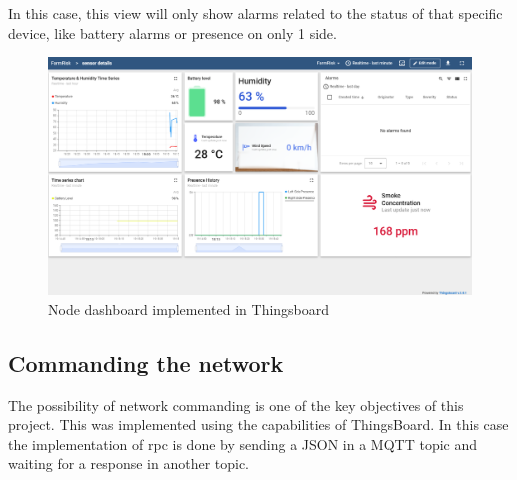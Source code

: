 \begin{itemize}
    In this case, this view will only show alarms related to the status of that specific device, like battery alarms or presence on only 1 side.
    \begin{figure}[H]
        \centering
        \includegraphics[width=1\textwidth]{./images/8/NodeDashboard.png}
        \caption{Node dashboard implemented in Thingsboard}
        \label{fig:NodeThingsboard}
    \end{figure}
\end{itemize}

\clearpage
\subsection{Commanding the network}

The possibility of network commanding is one of the key objectives of this project. This was implemented using the  capabilities of ThingsBoard. 
In this case the implementation of \acrshort{rpc} is done by sending a JSON in a MQTT topic and waiting for a response in another topic.

